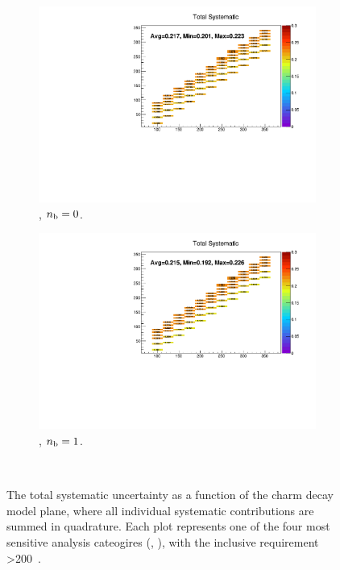 \begin{figure}[h!]
\begin{subfigure}[b]{0.47\textwidth}
    \includegraphics[width=\textwidth]{Figs/sms/t2cc/v37_3/systs/total_T2cc_eq0b_ge4j_incl.pdf}
    \caption{\njhigh, $n_{\text{b}} = 0$.}
  \end{subfigure}
  \begin{subfigure}[b]{0.47\textwidth}
    \includegraphics[width=\textwidth]{Figs/sms/t2cc/v37_3/systs/total_T2cc_eq1b_ge4j_incl.pdf}
    \caption{\njhigh, $n_{\text{b}} = 1$.}
  \end{subfigure}\\
  \caption{The total systematic uncertainty as a function of the charm decay
  model plane,
  where all individual systematic contributions are summed in quadrature.
  Each plot represents one of the four most sensitive 
  analysis cateogires (\nb, \nj), with the inclusive requirement \HT>200~\gev.}
  \label{fig:sms-totalsyst-t2cc}
\end{figure}

